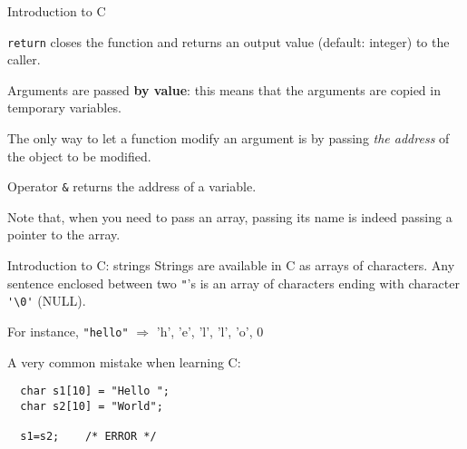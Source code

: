 \begin{frame}[fragile]{Introduction to C}

\texttt{return} closes the function and returns an output value
(default: integer) to the caller.


\vspace{20pt}

Arguments are passed \textbf{by value}: this means that
the arguments are copied in temporary variables.


\vspace{20pt}

The only way to let a function modify an argument is by passing
\emph{the address\/} of the object to be modified. 


\vspace{20pt}

Operator \verb"&" returns the address of a variable.


\vspace{20pt}

Note that, when you need to pass an array, passing its name is
indeed passing a pointer to the array.


\end{frame}
\begin{frame}[fragile]{Introduction to C: strings}
Strings are available in C as arrays of characters. Any sentence
enclosed between two \verb'"''s is an array of characters ending
with character \verb"'\0'" (NULL).


\vspace{20pt}

For instance, {\tt "hello"} $\Rightarrow$ 'h', 'e', 'l', 'l', 'o', 0


\vspace{20pt}

A very common mistake when learning C:

\begin{tt}
\begin{verbatim}
  char s1[10] = "Hello ";
  char s2[10] = "World";

  s1=s2;    /* ERROR */
\end{verbatim}
\end{tt}



\end{frame}
